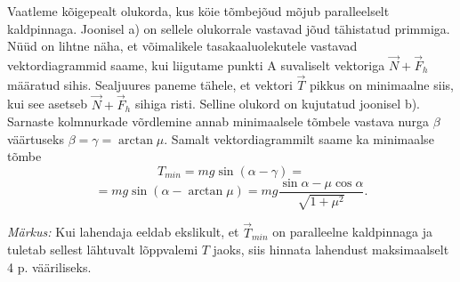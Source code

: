 Vaatleme kõigepealt olukorda, kus köie tõmbejõud mõjub paralleelselt kaldpinnaga. Joonisel a) on sellele olukorrale vastavad jõud tähistatud primmiga. Nüüd on lihtne näha, et võimalikele tasakaaluolekutele vastavad vektordiagrammid saame, kui liigutame punkti A suvaliselt vektoriga $\overrightarrow{N}+\overrightarrow{F}_h$ määratud sihis. Sealjuures paneme tähele, et vektori $\overrightarrow{T}$ pikkus on minimaalne siis, kui see asetseb $\overrightarrow{N}+\overrightarrow{F}_h$ sihiga risti. Selline olukord on kujutatud joonisel b). Sarnaste kolmnurkade võrdlemine annab minimaalsele tõmbele vastava nurga $\beta$ väärtuseks $\beta=\gamma=\arctan\mu$. Samalt vektordiagrammilt saame ka minimaalse tõmbe
\[T_{min}=mg\sin(\alpha-\gamma)=\]
\[=mg\sin(\alpha-\arctan\mu)= mg\frac{\sin\alpha-\mu\cos\alpha}{\sqrt{1+\mu^2}}.\]


\emph{Märkus:} Kui lahendaja eeldab ekslikult, et $\overrightarrow{T}_{min}$ on paralleelne kaldpinnaga ja tuletab sellest lähtuvalt lõppvalemi $T$ jaoks, siis hinnata lahendust
maksimaalselt 4 p. vääriliseks.

